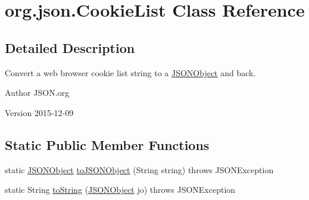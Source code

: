 \hypertarget{classorg_1_1json_1_1CookieList}{\section{org.\-json.\-Cookie\-List Class Reference}
\label{classorg_1_1json_1_1CookieList}
}


\subsection{Detailed Description}
Convert a web browser cookie list string to a \hyperlink{classorg_1_1json_1_1JSONObject}{J\-S\-O\-N\-Object} and back. \begin{DoxyAuthor}{Author}
J\-S\-O\-N.\-org 
\end{DoxyAuthor}
\begin{DoxyVersion}{Version}
2015-\/12-\/09 
\end{DoxyVersion}
\subsection*{Static Public Member Functions}
\begin{DoxyCompactItemize}
\item 
static \hyperlink{classorg_1_1json_1_1JSONObject}{J\-S\-O\-N\-Object} \hyperlink{classorg_1_1json_1_1CookieList_a3f79cd0dadd831ff9bdfb6afd41cd081}{to\-J\-S\-O\-N\-Object} (String string)  throws J\-S\-O\-N\-Exception 
\item 
static String \hyperlink{classorg_1_1json_1_1CookieList_a40f938404f28eda8b66bc17dfcd2261f}{to\-String} (\hyperlink{classorg_1_1json_1_1JSONObject}{J\-S\-O\-N\-Object} jo)  throws J\-S\-O\-N\-Exception 
\end{DoxyCompactItemize}


